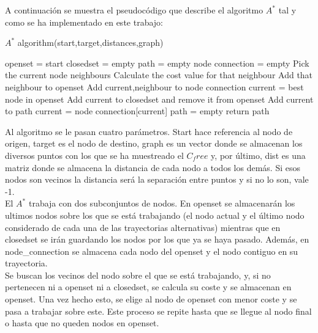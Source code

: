 A continuación se muestra el pseudocódigo que describe el algoritmo $A^*$ tal y como se ha implementado en este trabajo:\\

\begin{algorithm}
\caption{$A^*$ algorithm(start,target,distances,graph)}\label{A_algorithm}
\begin{algorithmic}
\State openset = start
\State closedset = empty
\State path = empty
\State node connection = empty
 \State Pick the current node neighbours
 \State Calculate the cost value for that neighbour
 \State Add that neighbour to openset
 \State Add current,neighbour to node connection
\EndFor
\State current = best node in openset
\State Add current to closedset and remove it from openset
\EndWhile
{}
\State Add current to path
\State current = node connection[current]
\EndWhile
\Else
\State path = empty
\EndIf
\State return path
\end{algorithmic}
\end{algorithm}  

Al algoritmo se le pasan cuatro parámetros. Start hace referencia al nodo de origen, target es el nodo de destino, graph es un vector donde se almacenan los diversos puntos con los que se ha muestreado el $C_free$ y, por último, dist es una matriz donde se almacena la distancia de cada nodo a todos los demás. Si esos nodos son vecinos la distancia será la separación entre puntos y si no lo son, vale -1.\\

El $A^*$ trabaja con dos subconjuntos de nodos. En openset se almacenarán los ultimos nodos sobre los que se está trabajando (el nodo actual y el último nodo considerado de cada una de las trayectorias alternativas) mientras que en closedset se irán guardando los nodos por los que ya se haya pasado. Además, en node_connection se almacena cada nodo del openset y el nodo contiguo en su trayectoria.\\

Se buscan los vecinos del nodo sobre el que se está trabajando, y, si no pertenecen ni a openset ni a closedset, se calcula su coste y se almacenan en openset. Una vez hecho esto, se elige al nodo de openset con menor coste y se pasa a trabajar sobre este. Este proceso se repite hasta que se llegue al nodo final o hasta que no queden nodos en openset.\\

